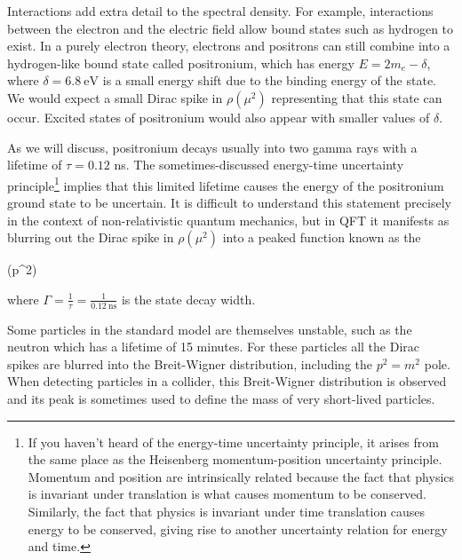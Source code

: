 Interactions add extra detail to the spectral density. For example, interactions between the electron and the electric field allow bound states such as hydrogen to exist. In a purely electron theory, electrons and positrons can still combine into a hydrogen-like bound state called positronium, which has energy $E = 2m_e - \delta$, where $\delta=\SI{6.8}{\electronvolt}$ is a small energy shift due to the binding energy of the state. We would expect a small Dirac spike in $\rho(\mu^2)$ representing that this state can occur. Excited states of positronium would also appear with smaller values of $\delta$.

As we will discuss, positronium decays usually into two gamma rays with a lifetime of $\tau = 0.12$ ns. The sometimes-discussed energy-time uncertainty principle\footnote{If you haven't heard of the energy-time uncertainty principle, it arises from the same place as the Heisenberg momentum-position uncertainty principle. Momentum and position are intrinsically related because the fact that physics is invariant under translation is what causes momentum to be conserved. Similarly, the fact that physics is invariant under time translation causes energy to be conserved, giving rise to another uncertainty relation for energy and time.} implies that this limited lifetime causes the energy of the positronium ground state to be uncertain. It is difficult to understand this statement precisely in the context of non-relativistic quantum mechanics, but in QFT it manifests as blurring out the Dirac spike in $\rho(\mu^2)$ into a peaked function known as the   
\begin{e}
  \rho(p^2) \propto {}
\end{e}
where $\Gamma = \frac{1}{\tau} = \frac{1}{\SI{0.12}{\nano\second}}$ is the state decay width.

Some particles in the standard model are themselves unstable, such as the neutron which has a lifetime of 15 minutes. For these particles all the Dirac spikes are blurred into the Breit-Wigner distribution, including the $p^2=m^2$ pole. When detecting particles in a collider, this Breit-Wigner distribution is observed and its peak is sometimes used to define the mass of very short-lived particles.

